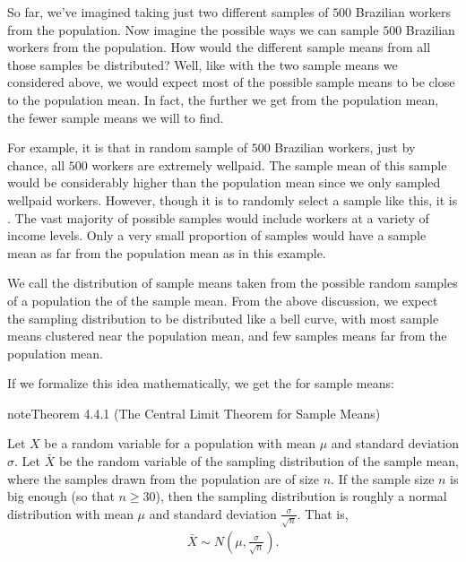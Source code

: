 \documentclass[letterpaper,10pt,english]{jupyterBook}
\begin{document}
\sphinxAtStartPar
So far, we’ve imagined taking just two different samples of \(500\) Brazilian workers from the population. Now imagine  the possible ways we can sample \(500\) Brazilian workers from the population. How would the different sample means from all those samples be distributed? Well, like with the two sample means we considered above, we would expect most of the possible sample means to be close to the population mean. In fact, the further we get from the population mean, the fewer sample means we will to find.

\sphinxAtStartPar
For example, it is  that in random sample of \(500\) Brazilian workers, just by chance, all \(500\) workers are extremely well\sphinxhyphen{}paid. The sample mean of this sample would be considerably higher than the population mean since we only sampled well\sphinxhyphen{}paid workers. However, though it is  to randomly select a sample like this, it is . The vast majority of possible samples would include workers at a variety of income levels. Only a very small proportion of samples would have a sample mean as far from the population mean as in this example.

\sphinxAtStartPar
We call the distribution of sample means taken from the possible random samples of a population the  of the sample mean. From the above discussion, we expect the sampling distribution to be distributed like a bell curve, with most sample means clustered near the population mean, and few samples means far from the population mean.

\sphinxAtStartPar
If we formalize this idea mathematically, we get the  for sample means:
\label{Ch4 The Normal Distribution and the Central Limit Theorem/4.4 The Central Limit Theorem for Means:theorem-0}
\begin{sphinxadmonition}{note}{Theorem 4.4.1 (The Central Limit Theorem for Sample Means)}



\sphinxAtStartPar
Let \(X\) be a random variable for a population with mean \(\mu\) and standard deviation \(\sigma\). Let \(\bar{X}\) be the random variable of the sampling distribution of the sample mean, where the samples drawn from the population are of size \(n\). If the sample size \(n\) is big enough (so that \(n \geq 30\)), then the sampling distribution is roughly a normal distribution with mean \(\mu\) and standard deviation \(\frac{\sigma}{\sqrt{n}}\). That is,
\begin{equation*}
\begin{split} \bar{X} \sim N\left(\mu, \frac{\sigma}{\sqrt{n}}\right). \end{split}
\end{equation*}\end{sphinxadmonition}
\end{document}
